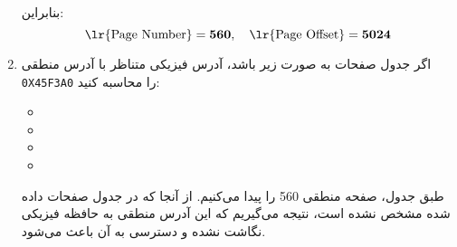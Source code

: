\begin{enumerate}
\begin{qsolve}
		بنابراین:
		\[
		\text{\lr{Page Number}} = \mathbf{560}, \quad \text{\lr{Page Offset}} = \mathbf{5024}
		\]
	\end{qsolve}
	
	
	
	
	\item اگر جدول صفحات به صورت زیر باشد، آدرس فیزیکی متناظر با آدرس منطقی \texttt{0X45F3A0} را محاسبه کنید:



\begin{latin}
	\begin{itemize}
		\item {}
		\item {}
		\item {}
		\item {}
	\end{itemize}
\end{latin}

\begin{qsolve}
	
طبق جدول، صفحه منطقی 560 را پیدا می‌کنیم. از آنجا که در جدول صفحات داده شده  مشخص نشده است، نتیجه می‌گیریم که این آدرس منطقی به حافظه فیزیکی نگاشت نشده و دسترسی به آن باعث  می‌شود.
	
\end{qsolve}

\end{enumerate}
